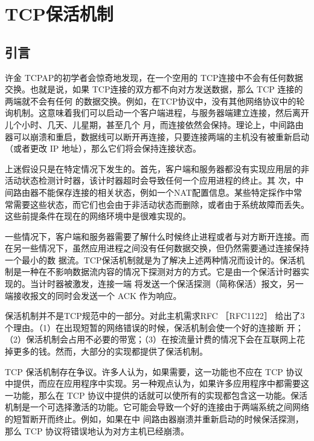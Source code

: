 \chapter{TCP保活机制}
\minitoc

\section{引言}
许金 TCPAP的初学者会惊奇地发现，在一个空用的 TCP连接中不会有任何数据交换。也就是说，如果 TCP连接的双方都不向对方发送数据，那么 TCP 连接的两端就不会有任何
的数据交换。例如，在TCP协议中，没有其他网络协议中的轮询机制。这意味着我们可以启动一个客户端进程，与服务器端建立连接，然后离开儿个小时、几天、儿星期，甚至几个
月，而连接依然会保持。理论上，中间路由器可以崩溃和重启，数据线可以断开再连接，只要连接两端的主机没有被重新启动（或者更改 IP 地址），那么它们将会保持连接状态。

\begin{tcolorbox}
    上迷假设只是在特定情况下发生的。首先，客户端和服务器都没有实现应用层的非活动状态检测计时器，该计时器超时会导致任何一个应用进程的终止。其
    次，中间路由器不能保存连接的相关状态，例如一个NAT配置信息。某些特定採作中常常需要这些状态，而它们也会由于非活动状态而删除，或者由于系统故障而丢失。这些前提条件在现在的网络环境中是很难实现的。
\end{tcolorbox}

一些情况下，客户端和服务器需要了解什么时候终止进程或者与对方断开连接。而在另一些情况下，虽然应用进程之间没有任何数据交换，但仍然需要通过连接保持一个最小的数
据流。TCP保活机制就是为了解决上述两种情况而设计的。保活机制是一种在不影响数据流内容的情况下探测对方的方式。它是由一个保活计时器实现的。当计时器被激发，连接一端
将发送一个保活探测（简称保活）报文，另一端接收报文的同时会发送一个 ACK 作为响应。

\begin{tcolorbox}
    保活机制并不是TCP规范中的一部分。对此主机需求RFC ［RFC1122］ 给出了3个理由。（1）在出现短暂的网络错误的时候，保活机制会使一个好的连接断
    开；（2）保活机制会占用不必要的带宽；（3）在按流量计费的情况下会在互联网上花掉更多的钱。然而，大部分的实现都提供了保活机制。
\end{tcolorbox}

TCP 保活机制存在争议。许多人认为，如果需要，这一功能也不应在 TCP 协议中提供，而应在应用程序中实现。另一种观点认为，如果许多应用程序中都需要这一功能，那么在
TCP 协议中提供的话就可以使所有的实现都包含这一功能。保活机制是一个可选择激活的功能。它可能会导致一个好的连接由于两端系统之间网络的短暂断开而终止。例如，如果在中
间路由器崩溃并重新启动的时候保活探测，那么 TCP 协议将错误地认为对方主机已经崩溃。

